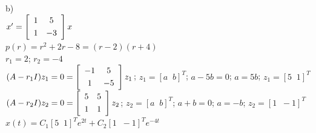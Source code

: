 \documentclass{article}
\begin{document}
\begin{enumerate}
\begin{figure}[h]
\centerline{}
\end{figure}
\\
\\b)
\\$x'=\left[\begin{array}{cc}1&5 \smallskip\\1&-3\end{array}\right]x$
\\$p(r)=r^2+2r-8=(r-2)(r+4)$
\\$r_1=2$; $r_2=-4$
\\$(A-r_1I)z_1=0=\left[\begin{array}{cc}-1&5 \smallskip\\1&-5\end{array}\right]z_1$; $z_1=[a\;\;b]^T$; $a-5b=0$; $a=5b$; $z_1=[5\;\;1]^T$
\\$(A-r_2I)z_2=0=\left[\begin{array}{cc}5&5 \smallskip\\1&1\end{array}\right]z_2$; $z_2=[a\;\;b]^T$; $a+b=0$; $a=-b$; $z_2=[1\;\;-1]^T$
\\$x(t)=C_1[5\;\;1]^Te^{2t}+C_2[1\;\;-1]^Te^{-4t}$

\end{enumerate}
\end{document}

